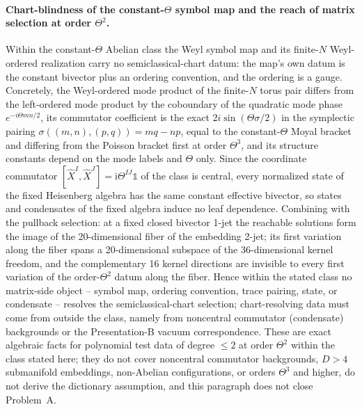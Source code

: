 \paragraph{Chart-blindness of the constant-\(\Theta\) symbol map and the reach of matrix selection at order \(\Theta^2\).} Within the constant-\(\Theta\) Abelian class the Weyl symbol map and its finite-\(N\) Weyl-ordered realization carry no semiclassical-chart datum: the map's own datum is the constant bivector plus an ordering convention, and the ordering is a gauge. Concretely, the Weyl-ordered mode product of the finite-\(N\) torus pair differs from the left-ordered mode product by the coboundary of the quadratic mode phase \(e^{-i\Theta m n/2}\), its commutator coefficient is the exact \(2i\sin(\Theta\sigma/2)\) in the symplectic pairing \(\sigma((m,n),(p,q))=mq-np\), equal to the constant-\(\Theta\) Moyal bracket and differing from the Poisson bracket first at order \(\Theta^3\), and its structure constants depend on the mode labels and \(\Theta\) only. Since the coordinate commutator \([\hat X^I,\hat X^J]=\mathrm i\Theta^{IJ}\mathbb 1\) of the class is central, every normalized state of the fixed Heisenberg algebra has the same constant effective bivector, so states and condensates of the fixed algebra induce no leaf dependence. Combining with the pullback selection: at a fixed closed bivector 1-jet the reachable solutions form the image of the 20-dimensional fiber of the embedding 2-jet; its first variation along the fiber spans a 20-dimensional subspace of the 36-dimensional kernel freedom, and the complementary 16 kernel directions are invisible to every first variation of the order-\(\Theta^2\) datum along the fiber. Hence within the stated class no matrix-side object -- symbol map, ordering convention, trace pairing, state, or condensate -- resolves the semiclassical-chart selection; chart-resolving data must come from outside the class, namely from noncentral commutator (condensate) backgrounds or the Presentation-B vacuum correspondence. These are exact algebraic facts for polynomial test data of degree \(\le 2\) at order \(\Theta^2\) within the class stated here; they do not cover noncentral commutator backgrounds, \(D>4\) submanifold embeddings, non-Abelian configurations, or orders \(\Theta^3\) and higher, do not derive the dictionary assumption, and this paragraph does not close Problem~A.

